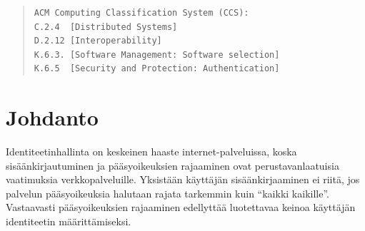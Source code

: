 \documentclass[finnish,gradu]{tktltiki}
\makeatletter
\newcommand{\gradutableofcontents}{%
  \tableofcontents
  \newpage
  \listoffigures
  \newpage
  \pagenumbering{arabic}
  \if@emptyfirstpagenumber
    \thispagestyle{empty}
  \fi
}
\makeatother
\begin{document}
\begin{abstract}





\begin{verbatim}
ACM Computing Classification System (CCS):
C.2.4  [Distributed Systems]
D.2.12 [Interoperability]
K.6.3. [Software Management: Software selection]
K.6.5  [Security and Protection: Authentication]
\end{verbatim}

\end{abstract}

\setcounter{tocdepth}{3}
\gradutableofcontents

\section{Johdanto} %
\label{sec:johdanto}

  Identiteetinhallinta on keskeinen haaste internet-palveluissa, koska sisäänkirjautuminen ja pääsyoikeuksien rajaaminen ovat perustavanlaatuisia vaatimuksia verkkopalveluille. Yksistään käyttäjän sisäänkirjaaminen ei riitä, jos palvelun pääsyoikeuksia halutaan rajata tarkemmin kuin ``kaikki kaikille''. Vastaavasti pääsyoikeuksien rajaaminen edellyttää luotettavaa keinoa käyttäjän identiteetin määrittämiseksi.
\end{document}
